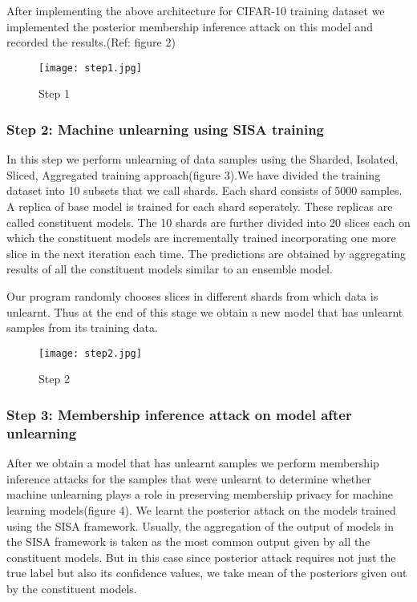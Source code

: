 \documentclass[11pt,letterpaper]{article}
\begin{document}
After implementing the above architecture for CIFAR-10 training dataset we implemented the posterior membership inference attack on this model and recorded the results.(Ref: figure 2)
\begin{figure}[!htp]
    \centering
    \texttt{[image: step1.jpg]}
    \caption{Step 1}
    \label{fig:galaxy1}
\end{figure}

\subsubsection{Step 2: Machine unlearning using SISA training}
In this step we perform unlearning of data samples using the Sharded, Isolated, Sliced, Aggregated training approach(figure 3).We have divided the training dataset into 10 subsets that we call shards. Each shard consists of 5000 samples. A replica of base model is trained for each shard seperately. These replicas are called constituent models. The 10 shards are further divided into 20 slices each on which the constituent models are incrementally trained incorporating one more slice in the next iteration each time. The predictions are obtained by aggregating results of all the constituent models similar to an ensemble model.\par
Our program randomly chooses slices in different shards from which data is unlearnt. Thus at the end of this stage we obtain a new model that has unlearnt samples from its training data.

\begin{figure}[!h]
    \centering
    \texttt{[image: step2.jpg]}
    \caption{Step 2}
    \label{fig:galaxy1}
\end{figure}

\subsubsection{Step 3: Membership inference attack on model after unlearning}
After we obtain a model that has unlearnt samples we perform membership inference attacks for the samples that were unlearnt to determine whether machine unlearning plays a role in preserving membership privacy for machine learning models(figure 4). We learnt the posterior attack on the models trained using the SISA framework. Usually, the aggregation of the output of models in the SISA framework is taken as the most common output given by all the constituent models. But in this case since posterior attack requires not just the true label but also its confidence values, we take mean of the posteriors given out by the constituent models. 
\end{document}
